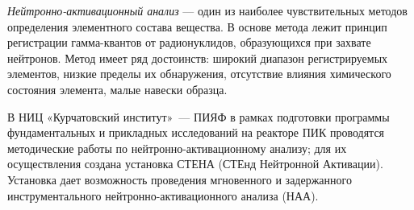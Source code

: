 \documentclass[
portrait,
a0paper%
]
{baposter}
\newcommand{\BoxBodySize}{\fontsize{8}{9.2}\selectfont}
\newcommand{\italicemph}[1]{\textit{#1}}
\let\emph\italicemph
\begin{document}
\begin{poster}
{%
    \BoxBodySize
    \emph{Нейтронно-активационный анализ} --- один из наиболее чувствительных методов определения элементного состава вещества. В основе метода лежит принцип регистрации гамма-квантов от радионуклидов, образующихся при захвате нейтронов. Метод имеет ряд достоинств: широкий диапазон регистрируемых элементов, низкие пределы их обнаружения, отсутствие влияния химического состояния элемента, малые навески образца.

    В НИЦ «Курчатовский институт»~--- ПИЯФ в рамках подготовки программы фундаментальных и прикладных исследований на реакторе ПИК проводятся методические работы по нейтронно-активационному анализу; для их осуществления создана установка СТЕНА (СТЕнд Нейтронной Активации). Установка дает возможность проведения мгновенного и задержанного инструментального \linebreak нейтронно-активационного анализа (НАА).
}


\end{poster}
\end{document}
